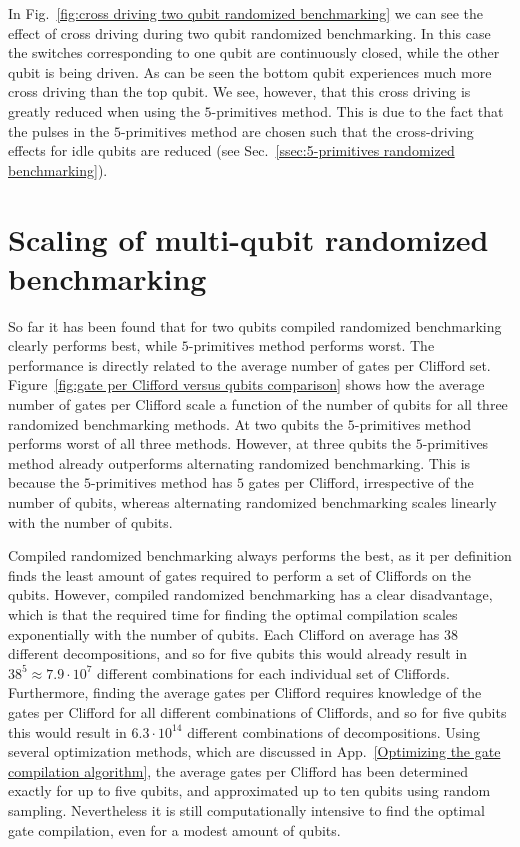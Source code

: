           In Fig.~\ref{fig:cross driving two qubit randomized benchmarking} we can see the effect of cross driving during two qubit randomized benchmarking. In this case the switches corresponding to one qubit are continuously closed, while the other qubit is being driven. As can be seen the bottom qubit experiences much more cross driving than the top qubit. We see, however, that this cross driving is greatly reduced when using the $5$-primitives method. This is due to the fact that the pulses in the $5$-primitives method are chosen such that the cross-driving effects for idle qubits are reduced (see Sec.~\ref{ssec:5-primitives randomized benchmarking}).

        \section{Scaling of multi-qubit randomized benchmarking}
          \label{sec:scaling of multi-qubit randomized benchmarking}


          So far it has been found that for two qubits compiled randomized benchmarking clearly performs best, while $5$-primitives method performs worst. The performance is directly related to the average number of gates per Clifford set. Figure~\ref{fig:gate per Clifford versus qubits comparison} shows how the average number of gates per Clifford scale a function of the number of qubits for all three randomized benchmarking methods. At two qubits the $5$-primitives method performs worst of all three methods. However, at three qubits the $5$-primitives method already outperforms alternating randomized benchmarking. This is because the $5$-primitives method has $5$ gates per Clifford, irrespective of the number of qubits, whereas alternating randomized benchmarking scales linearly with the number of qubits.

          Compiled randomized benchmarking always performs the best, as it per definition finds the least amount of gates required to perform a set of Cliffords on the qubits. However, compiled randomized benchmarking has a clear disadvantage, which is that the required time for finding the optimal compilation scales exponentially with the number of qubits. Each Clifford on average has $38$ different decompositions, and so for five qubits this would already result in $38^5\approx 7.9 \cdot 10^{7}$ different combinations for each individual set of Cliffords. Furthermore, finding the average gates per Clifford requires knowledge of the gates per Clifford for all different combinations of Cliffords, and so for five qubits this would result in $6.3\cdot10^{14}$ different combinations of decompositions. Using several optimization methods, which are discussed in App.~\ref{Optimizing the gate compilation algorithm}, the average gates per Clifford has been determined exactly for up to five qubits, and approximated up to ten qubits using random sampling. Nevertheless it is still computationally intensive to find the optimal gate compilation, even for a modest amount of qubits.

